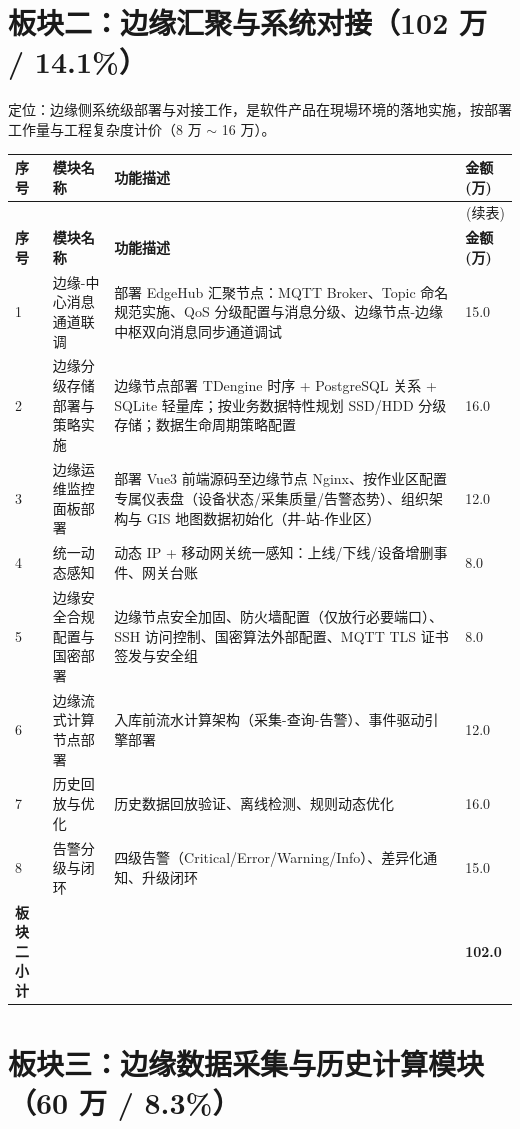 \documentclass[11pt,a4paper]{ctexart}
\begin{document}
\section{板块二：边缘汇聚与系统对接（102 万 / 14.1\%）}

定位：边缘侧系统级部署与对接工作，是软件产品在現場环境的落地实施，按部署工作量与工程复杂度计价（8 万 $\sim$ 16 万）。

\begin{longtable}{p{1.2cm} p{3.6cm} p{7.3cm} p{1.7cm}}
\toprule
\textbf{序号} & \textbf{模块名称} & \textbf{功能描述} & \textbf{金额(万)} \\
\midrule
\endfirsthead
\midrule
\multicolumn{4}{r}{(续表)} \\
\toprule
\textbf{序号} & \textbf{模块名称} & \textbf{功能描述} & \textbf{金额(万)} \\
\midrule
\endhead
1 & 边缘-中心消息通道联调 & 部署 EdgeHub 汇聚节点：MQTT Broker、Topic 命名规范实施、QoS 分级配置与消息分级、边缘节点-边缘中枢双向消息同步通道调试 & 15.0 \\
2 & 边缘分级存储部署与策略实施 & 边缘节点部署 TDengine 时序 + PostgreSQL 关系 + SQLite 轻量库；按业务数据特性规划 SSD/HDD 分级存储；数据生命周期策略配置 & 16.0 \\
3 & 边缘运维监控面板部署 & 部署 Vue3 前端源码至边缘节点 Nginx、按作业区配置专属仪表盘（设备状态/采集质量/告警态势）、组织架构与 GIS 地图数据初始化（井-站-作业区） & 12.0 \\
4 & 统一动态感知 & 动态 IP + 移动网关统一感知：上线/下线/设备增删事件、网关台账 & 8.0 \\
5 & 边缘安全合规配置与国密部署 & 边缘节点安全加固、防火墙配置（仅放行必要端口）、SSH 访问控制、国密算法外部配置、MQTT TLS 证书签发与安全组 & 8.0 \\
6 & 边缘流式计算节点部署 & 入库前流水计算架构（采集-查询-告警）、事件驱动引擎部署 & 12.0 \\
7 & 历史回放与优化 & 历史数据回放验证、离线检测、规则动态优化 & 16.0 \\
8 & 告警分级与闭环 & 四级告警（Critical/Error/Warning/Info）、差异化通知、升级闭环 & 15.0 \\
\midrule
\textbf{板块二小计} & & & \textbf{102.0} \\
\bottomrule
\end{longtable}

\section{板块三：边缘数据采集与历史计算模块（60 万 / 8.3\%）}
\end{document}
